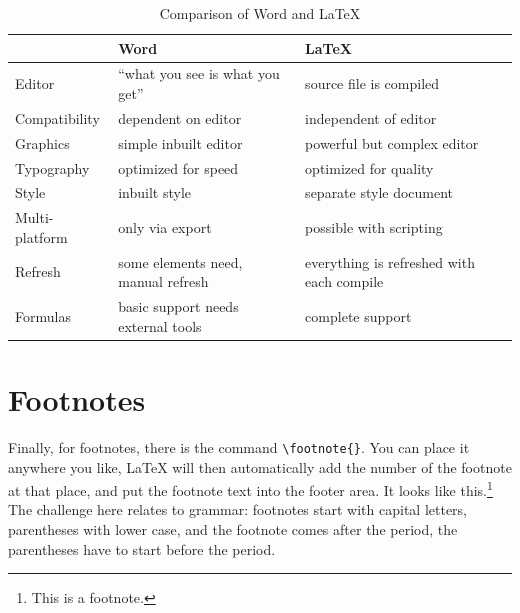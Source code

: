 \begin{table}[!ht]
    \centering
    \begin{tabular}{p{2.5cm}p{3.5cm}p{3.5cm}}
        \toprule
        & \textbf{Word} & \textbf{\LaTeX{}} \\ 
        \midrule
        
        Editor & ``what you see is what you get'' & source file is compiled \\
        \midrule
        
        Compatibility & dependent on editor & independent of editor \\
        \midrule
        
        Graphics & simple inbuilt editor & powerful but complex editor \\
        \midrule
        
        Typography & optimized for speed & optimized for quality \\
        \midrule
        
        Style & inbuilt style & separate style document \\
        \midrule
        
        Multi-platform & only via export & possible with scripting \\
        \midrule
        
        Refresh & some elements need, manual refresh & everything is refreshed with each compile \\
        \midrule
        
        Formulas & basic support needs external tools & complete support \\
        \bottomrule
    
    \end{tabular}
    \caption{Comparison of Word and \LaTeX{}}\label{tab:c1_comparisonwordlatex}
\end{table}

\section{Footnotes}\label{sec:c1_footnotes}

Finally, for footnotes, there is the command
\lstinline[language=Tex]!\footnote{}!. You can place it anywhere you like,
\LaTeX{} will then automatically add the number of the footnote at that place,
and put the footnote text into the footer area. It looks like
this.\footnote{This is a footnote.} The challenge here relates to grammar:
footnotes start with capital letters, parentheses with lower case, and the
footnote comes after the period, the parentheses have to start before the
period.

